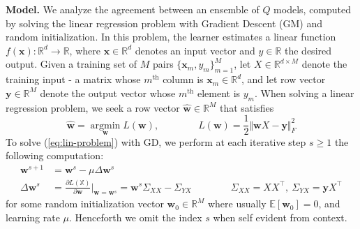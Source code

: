 \documentclass{article}
\DeclareMathOperator{\argmin}{argmin}
\newcommand{\bx}{\bm{x}}
\newcommand{\by}{\bm{y}}
\newcommand{\bW}{\bm{w}}
\newcommand{\R}{\mathbb{R}}
\newcommand{\E}{\mathbb{E}}
\newcommand{\hW}{{\bW}}
\newcommand{\dW}{\Delta\bW}
\newcommand{\iX}{\mathbb{X}}
\newcommand{\SXX}{\Sigma_{\scriptscriptstyle XX}}
\newcommand{\SYX}{\Sigma_{\scriptscriptstyle YX}}
\newcommand{\myparagraph}[1]{\smallskip\noindent\textbf{#1}}
\begin{document}
\myparagraph{Model.}
We analyze the agreement between an ensemble of $Q$ models, computed by solving the linear regression problem with Gradient Descent (GM) and random initialization. In this problem, the learner estimates a linear function $f(\bx): \R^d\to \R$, where $\bx\in\R^d$ denotes an input vector and $y\in\R$ the desired output. Given a training set of $M$ pairs $\{\bx_m,y_m\}_{m=1}^M$, let $X\in\R^{d\times M}$ denote the training input - a matrix whose $m^\mathrm{th}$ column is $\bx_m\in\R^d$, and let row vector $\by\in\R^M$ denote the output vector whose $m^\mathrm{th}$ element is $y_m$. When solving a linear regression problem, we seek a row vector $\hat\hW\in\R^M$ that satisfies
\begin{equation}
\label{eq:lin-problem}
\hat\hW = \argmin\limits_\hW L(\hW), \qquad\qquad L(\hW) =  \frac{1}{2} \Vert \hW X-\by  \Vert_F^2
\end{equation}
To solve (\ref{eq:lin-problem}) with GD, we perform at each iterative step $s\geq 1$ the following computation:
\begin{equation}
\label{eq:gradient-step}
\begin{split}
\hW^{s+1} &= \hW^s -\mu \dW^s \\
\dW^s &= \frac{\partial L(\iX)}{\partial\hW}\bigg\vert_{\hW=\hW^s} = \hW^s\SXX-\SYX \qquad\qquad \SXX=X X^\top, ~\SYX=\by  X^\top
\end{split}
\end{equation}
for some random initialization vector $\hW_0\in\R^M$ where usually $\E[\hW_0]=0$, and learning rate $\mu$. Henceforth we omit the index $s$ when self evident from context.
\end{document}
